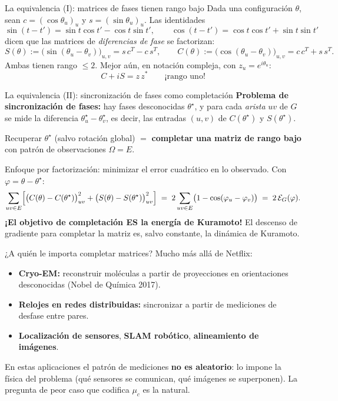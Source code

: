 \documentclass[10pt,aspectratio=169]{beamer}
\newcommand{\E}{\mathcal{E}}
\begin{document}
\begin{frame}{La equivalencia (I): matrices de fases tienen rango bajo}
Dada una configuración $\theta$, sean $c = (\cos\theta_u)_u$ y $s=(\sin\theta_u)_u$. Las identidades
\[
\sin(t-t') = \sin t\cos t' - \cos t \sin t', \qquad
\cos(t-t') = \cos t\cos t' + \sin t\sin t'
\]
dicen que las matrices de \emph{diferencias de fase} se factorizan:
\[
S(\theta) := \bigl(\sin(\theta_u-\theta_v)\bigr)_{u,v} = s\,c^{T} - c\,s^{T},
\qquad
C(\theta) := \bigl(\cos(\theta_u-\theta_v)\bigr)_{u,v} = c\,c^{T} + s\,s^{T}.
\]
\pause
\medskip
Ambas tienen rango $\le 2$. Mejor aún, en notación compleja, con $z_u = e^{i\theta_u}$:
\[
C + iS = z\,z^* \qquad \text{¡rango uno!}
\]
\end{frame}

\begin{frame}{La equivalencia (II): sincronización de fases como completación}
\textbf{Problema de sincronización de fases:} hay fases desconocidas $\theta^\star$, y para cada \emph{arista} $uv$ de $G$ se mide la diferencia $\theta^\star_u - \theta^\star_v$, es decir, las entradas $(u,v)$ de $C(\theta^\star)$ y $S(\theta^\star)$.
\medskip

Recuperar $\theta^\star$ (salvo rotación global) $=$ \textbf{completar una matriz de rango bajo} con patrón de observaciones $\Omega = E$.
\pause
\medskip

Enfoque por factorización: minimizar el error cuadrático en lo observado. Con $\varphi = \theta - \theta^\star$:
\[
\sum_{uv\in E}\Bigl[\bigl(C(\theta)-C(\theta^\star)\bigr)_{uv}^2 + \bigl(S(\theta)-S(\theta^\star)\bigr)_{uv}^2\Bigr]
\;=\; 2\sum_{uv\in E}\bigl(1-\cos(\varphi_u-\varphi_v)\bigr)
\;=\; 2\,\E_G(\varphi).
\]
\pause
\medskip
\textbf{¡El objetivo de completación ES la energía de Kuramoto!} El descenso de gradiente para completar la matriz es, salvo constante, la dinámica de Kuramoto.
\end{frame}


\begin{frame}{¿A quién le importa completar matrices?}
Mucho más allá de Netflix:
\medskip
\begin{itemize}
    \item \textbf{Cryo-EM:} reconstruir moléculas a partir de proyecciones en orientaciones desconocidas (Nobel de Química 2017).
    \item \textbf{Relojes en redes distribuidas:} sincronizar a partir de mediciones de desfase entre pares.
    \item \textbf{Localización de sensores}, \textbf{SLAM robótico}, \textbf{alineamiento de imágenes}.
\end{itemize}
\medskip
\pause
En estas aplicaciones el patrón de mediciones \textbf{no es aleatorio}: lo impone la física del problema (qué sensores se comunican, qué imágenes se superponen). La pregunta de peor caso que codifica $\mu_c$ es la natural.
\end{frame}
\end{document}
